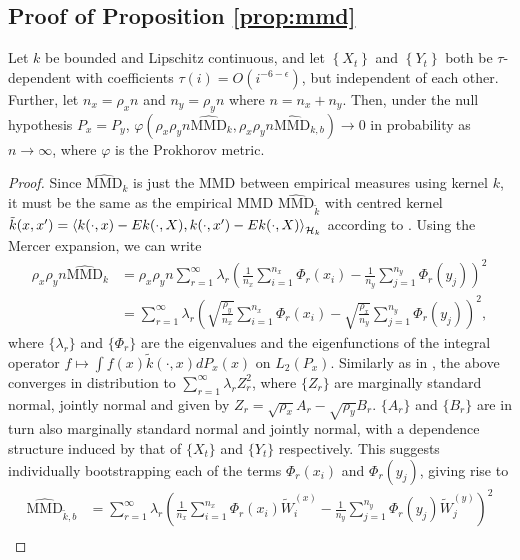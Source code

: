   \subsection{Proof of Proposition \ref{prop:mmd} }
  \label{sub:prop:mmd}
\begin{proposition*}
 Let $k$ be bounded and Lipschitz continuous, and let $\left\{ X_t \right\}$ and $\left\{ Y_t \right\}$ 
 both be $\tau$-dependent with coefficients $\tau(i) =  O(i^{-6-\epsilon})$, but independent of each other. Further, let $n_x=\rho_x n$ and $n_y=\rho_y n$ where $n=n_x+n_y$. Then, under the null hypothesis $P_x=P_y$, $\varphi\left(\rho_x \rho_y n\widehat{\text{MMD}}_k, \rho_x \rho_y n\widehat{\text{MMD}}_{k,b}\right)\to 0$ in probability as $n\to\infty$, where $\varphi$ is the Prokhorov metric.
\end{proposition*}
  \begin{proof}
  Since $\widehat{\text{MMD}}_k$ is just the MMD between empirical measures
using kernel $k$, it must be the same as the empirical MMD $\widehat{\text{MMD}}_{\tilde k}$ with centred kernel $\tilde{k}(x,x')=\left \langle k(\cdot,x)-E k(\cdot,X), k(\cdot,x')-E k(\cdot,X) \right \rangle_{\mathcal{H}_k}$ according to \cite[Theorem 22]{SejSriGreFuk13}. Using the Mercer expansion, we can write
\begin{align*}
\rho_x \rho_y n\widehat{\text{MMD}}_k & = \rho_{x}\rho_{y}n\sum_{r=1}^{\infty}\lambda_{r}\left(\frac{1}{n_{x}}\sum_{i=1}^{n_{x}}\Phi_{r}(x_{i})-\frac{1}{n_{y}}\sum_{j=1}^{n_{y}}\Phi_{r}(y_{j})\right)^{2}\\
 & = \sum_{r=1}^{\infty}\lambda_{r}\left(\sqrt{\frac{\rho_{y}}{n_{x}}}\sum_{i=1}^{n_{x}}\Phi_{r}(x_{i})-\sqrt{\frac{\rho_{x}}{n_{y}}}\sum_{j=1}^{n_{y}}\Phi_{r}(y_{j})\right)^{2},
\end{align*}
where $\{\lambda_r\}$ and $\{\Phi_r\}$ are the eigenvalues and the eigenfunctions of the integral operator $f\mapsto \int f(x)\tilde k(\cdot,x)dP_x(x)$ on $L_2(P_x)$. Similarly as in \cite[Theorem 2.1]{leucht_dependent_2013}, the above converges in distribution to $\sum_{r=1}^\infty \lambda_r Z_r^2$, where $\{Z_r\}$ are marginally standard normal, jointly normal and given by $Z_r=\sqrt{\rho_x}A_r-\sqrt{\rho_y}B_r$. $\{A_r\}$ and $\{B_r\}$ are in turn also marginally standard normal and jointly normal, with a dependence structure induced by that of $\{X_t\}$ and $\{Y_t\}$ respectively. This suggests individually bootstrapping each of the terms $\Phi_{r}(x_{i})$ and $\Phi_{r}(y_{j})$, giving rise to 
\begin{align*}
\widehat{\text{MMD}}_{\tilde k, b}&=\sum_{r=1}^{\infty}\lambda_{r}\left(\frac{1}{n_{x}}\sum_{i=1}^{n_{x}}\Phi_{r}(x_{i})\tilde W_i^{(x)}-\frac{1}{n_{y}}\sum_{j=1}^{n_{y}}\Phi_{r}(y_{j})\tilde W_j^{(y)}\right)^{2}\\

\end{align*}
\end{proof}
